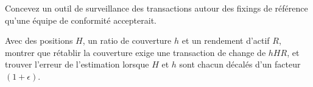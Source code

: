 \begin{interviewq}\label{iq:s2:fx-flow-strategies:5}
Concevez un outil de surveillance des transactions autour des fixings de référence qu'une équipe de conformité accepterait.
\end{interviewq}

\begin{interviewq}\label{iq:s2:fx-flow-strategies:6}
Avec des positions $H$, un ratio de couverture $h$ et un rendement d'actif $R$, montrer que rétablir la couverture exige une transaction de change de $hHR$, et trouver l'erreur de l'estimation
lorsque $H$ et $h$ sont chacun décalés d'un facteur $(1 + \epsilon)$.
\end{interviewq}
